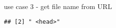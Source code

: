 \documentclass[ignorenonframetext,]{beamer}
\begin{document}
\begin{frame}[fragile]{use case 3 - get file name from URL}
\begin{verbatim}
## [2] " <head>"                                                                                                                                                                                                                                                                                                                                                                                                                                                                                                                                                                                                                                                                                                                                                                                                                                                                                                                                                                                                                                                                                                                                                                                                                                                                                                                                                                                                                                                                                                                                                                                                                                                                                                                                                                                                                                                                                                                                                                                                                                                       

\end{verbatim}
\end{frame}
\end{document}
